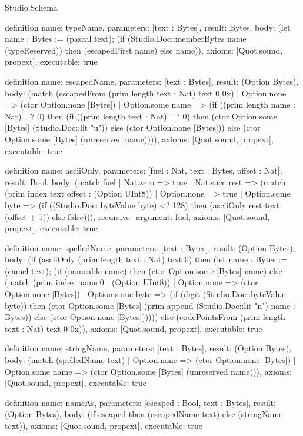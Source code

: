 \begin{lexlean}{Studio.Schema}
\begin{semanticmodule}
definition{
  name: typeName,
  parameters: [text : Bytes],
  result: Bytes,
  body: (let name : Bytes := (pascal text); (if (Studio.Doc::memberBytes name (typeReserved)) then (escapedFirst name) else name)),
  axioms: [Quot.sound, propext],
  executable: true
}

definition{
  name: escapedName,
  parameters: [text : Bytes],
  result: (Option Bytes),
  body: (match (escapedFrom (prim length text : Nat) text 0 0x)
    | Option.none => (ctor Option.none [Bytes])
    | Option.some name => (if ((prim length name : Nat) =? 0) then (if ((prim length text : Nat) =? 0) then (ctor Option.some [Bytes] (Studio.Doc::lit "u")) else (ctor Option.none [Bytes])) else (ctor Option.some [Bytes] (unreserved name)))),
  axioms: [Quot.sound, propext],
  executable: true
}

definition{
  name: asciiOnly,
  parameters: [fuel : Nat, text : Bytes, offset : Nat],
  result: Bool,
  body: (match fuel
    | Nat.zero => true
    | Nat.succ rest => (match (prim index text offset : (Option UInt8))
      | Option.none => true
      | Option.some byte => (if ((Studio.Doc::byteValue byte) <? 128) then (asciiOnly rest text (offset + 1)) else false))),
  recursive_argument: fuel,
  axioms: [Quot.sound, propext],
  executable: true
}

definition{
  name: spelledName,
  parameters: [text : Bytes],
  result: (Option Bytes),
  body: (if (asciiOnly (prim length text : Nat) text 0) then (let name : Bytes := (camel text); (if (nameable name) then (ctor Option.some [Bytes] name) else (match (prim index name 0 : (Option UInt8))
    | Option.none => (ctor Option.none [Bytes])
    | Option.some byte => (if (digit (Studio.Doc::byteValue byte)) then (ctor Option.some [Bytes] (prim append (Studio.Doc::lit "n") name : Bytes)) else (ctor Option.none [Bytes]))))) else (codePointsFrom (prim length text : Nat) text 0 0x)),
  axioms: [Quot.sound, propext],
  executable: true
}

definition{
  name: stringName,
  parameters: [text : Bytes],
  result: (Option Bytes),
  body: (match (spelledName text)
    | Option.none => (ctor Option.none [Bytes])
    | Option.some name => (ctor Option.some [Bytes] (unreserved name))),
  axioms: [Quot.sound, propext],
  executable: true
}

definition{
  name: nameAs,
  parameters: [escaped : Bool, text : Bytes],
  result: (Option Bytes),
  body: (if escaped then (escapedName text) else (stringName text)),
  axioms: [Quot.sound, propext],
  executable: true
}


\end{semanticmodule}
\end{lexlean}
